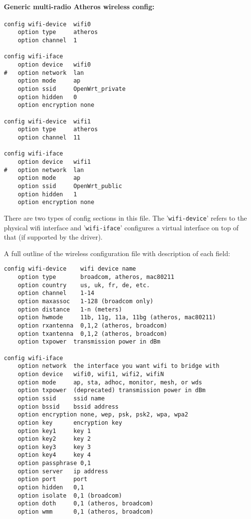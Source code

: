 \paragraph{Generic multi-radio Atheros wireless config:}

\begin{Verbatim}
config wifi-device  wifi0
    option type     atheros
    option channel  1

config wifi-iface
    option device   wifi0
#   option network  lan
    option mode     ap
    option ssid     OpenWrt_private
    option hidden   0
    option encryption none

config wifi-device  wifi1
    option type     atheros
    option channel  11

config wifi-iface
    option device   wifi1
#   option network  lan
    option mode     ap
    option ssid     OpenWrt_public
    option hidden   1
    option encryption none
\end{Verbatim}

There are two types of config sections in this file. The '\texttt{wifi-device}' refers to
the physical wifi interface and '\texttt{wifi-iface}' configures a virtual interface on top
of that (if supported by the driver).

A full outline of the wireless configuration file with description of each field:

\begin{Verbatim}
config wifi-device    wifi device name
    option type       broadcom, atheros, mac80211
    option country    us, uk, fr, de, etc.
    option channel    1-14
    option maxassoc   1-128 (broadcom only)
    option distance   1-n (meters)
    option hwmode     11b, 11g, 11a, 11bg (atheros, mac80211)
    option rxantenna  0,1,2 (atheros, broadcom)
    option txantenna  0,1,2 (atheros, broadcom)
    option txpower  transmission power in dBm

config wifi-iface
    option network  the interface you want wifi to bridge with
    option device   wifi0, wifi1, wifi2, wifiN
    option mode     ap, sta, adhoc, monitor, mesh, or wds
    option txpower  (deprecated) transmission power in dBm
    option ssid     ssid name
    option bssid    bssid address
    option encryption none, wep, psk, psk2, wpa, wpa2
    option key      encryption key
    option key1     key 1
    option key2     key 2
    option key3     key 3
    option key4     key 4
    option passphrase 0,1
    option server   ip address
    option port     port
    option hidden   0,1
    option isolate  0,1	(broadcom)
    option doth     0,1	(atheros, broadcom)
    option wmm      0,1	(atheros, broadcom)
\end{Verbatim}


